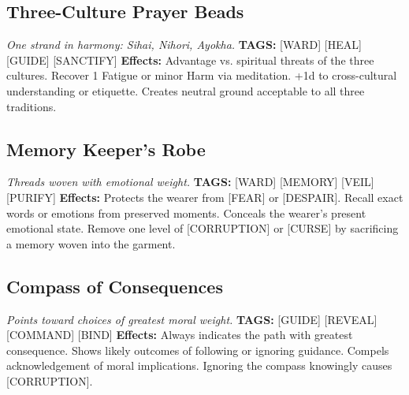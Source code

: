 \documentclass[12pt,oneside]{book}
\begin{document}
\subsection*{Three-Culture Prayer Beads}
\textit{One strand in harmony: Sihai, Nihori, Ayokha.}  
\textbf{TAGS:} [WARD] [HEAL] [GUIDE] [SANCTIFY]  
\textbf{Effects:} Advantage vs. spiritual threats of the three cultures. Recover 1 Fatigue or minor Harm via meditation. +1d to cross-cultural understanding or etiquette. Creates neutral ground acceptable to all three traditions.

\subsection*{Memory Keeper's Robe}
\textit{Threads woven with emotional weight.}  
\textbf{TAGS:} [WARD] [MEMORY] [VEIL] [PURIFY]  
\textbf{Effects:} Protects the wearer from [FEAR] or [DESPAIR]. Recall exact words or emotions from preserved moments. Conceals the wearer's present emotional state. Remove one level of [CORRUPTION] or [CURSE] by sacrificing a memory woven into the garment.

\subsection*{Compass of Consequences}
\textit{Points toward choices of greatest moral weight.}  
\textbf{TAGS:} [GUIDE] [REVEAL] [COMMAND] [BIND]  
\textbf{Effects:} Always indicates the path with greatest consequence. Shows likely outcomes of following or ignoring guidance. Compels acknowledgement of moral implications. Ignoring the compass knowingly causes [CORRUPTION].
\end{document}
